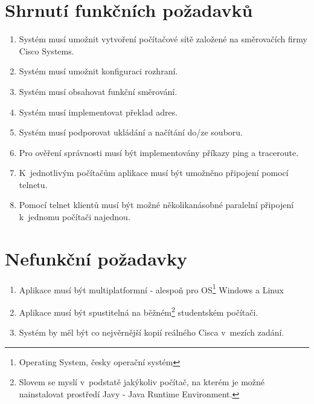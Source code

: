 \section{Shrnutí funkčních požadavků}
\begin{enumerate}
 \item Systém musí umožnit vytvoření počítačové sítě založené na směrovačích firmy Cisco Systems.
 \item Systém musí umožnit konfiguraci rozhraní.
 \item Systém musí obsahovat funkční směrování.
 \item Systém musí implementovat překlad adres.
 \item Systém musí podporovat ukládání a načítání do/ze souboru.
 \item Pro ověření správnosti musí být implementovány příkazy ping a traceroute.
 \item K~jednotlivým počítačům aplikace musí být umožněno připojení pomocí telnetu.
 \item Pomocí telnet klientů musí být možné několikanásobné paralelní připojení k~jednomu počítači najednou.

\end{enumerate}


\section{Nefunkční požadavky}
\begin{enumerate}
 \item Aplikace musí být multiplatformní - alespoň pro OS\footnote{Operating System, česky operační systém} Windows a Linux
 \item Aplikace musí být spustitelná na běžném\footnote{Slovem  se myslí v~podstatě jakýkoliv počítač, na kterém je možné nainstalovat prostředí Javy - Java Runtime Environment.} studentském počítači.
 \item Systém by měl být co nejvěrnější kopií reálného Cisca v~mezích zadání.
\end{enumerate}


